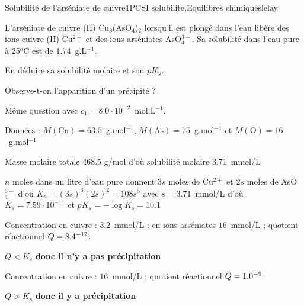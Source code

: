 \begin{exercise}{Solubilité de l'arséniate de cuivre}{1}{PCSI}
{solubilite,Equilibres chimiques}{lelay}

L'arséniate de cuivre (II) Cu$_3$(AsO$_4$)$_2$ lorsqu'il est plongé dans l'eau libère des ions cuivre (II) Cu$^{2+}$ et des ions arséniates AsO$_4^{3-}$. Sa solubilité dans l'eau pure à 25$^o$C est de 1.74~g.L$^{-1}$. 

\begin{questions}

    \question En déduire sa solubilité molaire et son $pK_s$.
    

    \question Observe-t-on l'apparition d'un précipité ?

    \question Même question avec $c_1 = 8.0\cdot 10^{-2}$~mol.L$^{-1}$.
    
\end{questions}
Données : $M(\text{Cu}) = 63.5$~g.mol$^{-1}$, $M(\text{As}) = 75$~g.mol$^{-1}$ et $M(\text{O}) = 16$~g.mol$^{-1}$
\end{exercise}

\begin{solution}
\begin{questions}

    \question Masse molaire totale 468.5 g/mol d'où solubilité molaire 3.71~mmol/L
    
    $n$ moles dans un litre d'eau pure donnent $3s$ moles de Cu$^{2+}$ et $2s$ moles de AsO$_4^{3-}$ d'où $K_s = (3s)^3(2s)^2  =108 s^5$ avec $s = 3.71$~mmol/L d'où $K_s = 7.59\cdot 10^{-11}$ et $pK_s = -\log K_s = 10.1$
    
    \question Concentration en cuivre : $3.2$~mmol/L ; en ions arséniates $16$~mmol/L ; quotient réactionnel $Q = 8.4\time 10^{-12}$.
    
    $Q < K_s$ \textbf{donc il n'y a pas précipitation}
    
    \question Concentration en cuivre : $16$~mmol/L ; quotient réactionnel $Q = 1.0\time 10^{-9}$.
    
    $Q > K_s$ \textbf{donc il y a précipitation}
    
\end{questions}
\end{solution}

